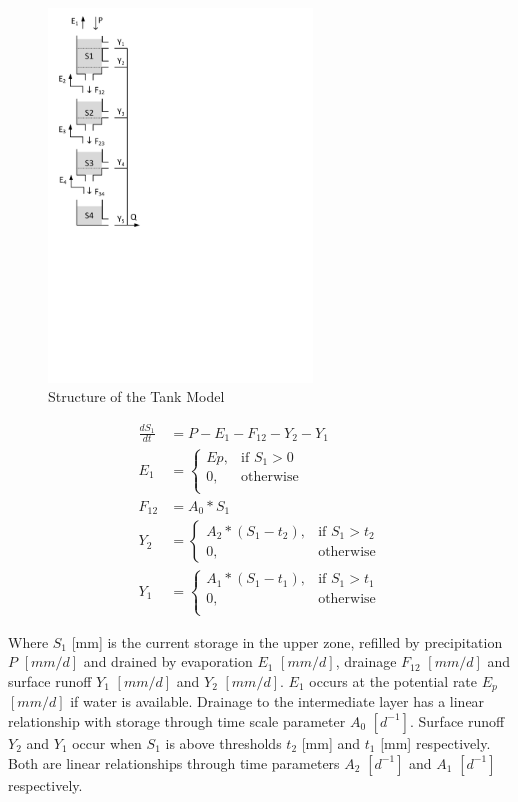 { 																	%
\begin{figure}
\includegraphics[trim=1cm 12cm 7cm 1cm,width=7cm,keepaspectratio]{./AppA_files/27_schematic.pdf}
\caption{Structure of the Tank Model} \label{fig:27_schematic}
\end{figure}

\begin{align}
	\frac{dS_1}{dt} &= P-E_1-F_{12}-Y_2-Y_1 \\
	E_1 &= \begin{cases}
		Ep, &\text{if } S_1 > 0 \\
		0, & \text{otherwise} \\
	\end{cases} \\
	F_{12} &= A_0*S_1\\
	Y_2 &= 
	\begin{cases}
		A_2*(S_1-t_2), & \text{if } S_1 > t_2 \\
		0, & \text{otherwise}
	\end{cases}\\
	Y_1 &= 
	\begin{cases}
		A_1*(S_1-t_1), & \text{if } S_1 > t_1 \\
		0, & \text{otherwise}\\
	\end{cases}
\end{align}

Where $S_1$ [mm] is the current storage in the upper zone, refilled by precipitation $P$ $[mm/d]$ and drained by evaporation $E_1$ $[mm/d]$, drainage $F_{12}$ $[mm/d]$ and surface runoff $Y_1$ $[mm/d]$ and $Y_2$ $[mm/d]$. $E_1$ occurs at the potential rate $E_p$ $[mm/d]$ if water is available. Drainage to the intermediate layer has a linear relationship with storage through time scale parameter $A_0$ $[d^{-1}]$. Surface runoff $Y_2$ and $Y_1$ occur when $S_1$ is above thresholds $t_2$ [mm] and $t_1$ [mm] respectively. Both are linear relationships through time parameters $A_2$ $[d^{-1}]$ and $A_1$ $[d^{-1}]$ respectively.

} %

